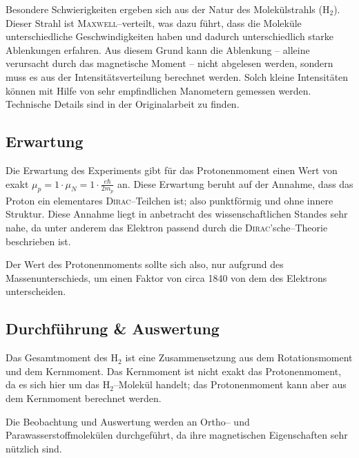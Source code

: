 \documentclass[sn-mathphys-num,iicol]{sn-jnl}
\theoremstyle{thmstyleone}
\theoremstyle{thmstyletwo}
\theoremstyle{thmstylethree}
\begin{document}
Besondere Schwierigkeiten ergeben sich aus der Natur des Molekülstrahls ($\text{H}_2$).
Dieser Strahl ist \textsc{Maxwell}--verteilt, was dazu führt, dass die Moleküle unterschiedliche Geschwindigkeiten haben und dadurch unterschiedlich starke Ablenkungen erfahren.
Aus diesem Grund kann die Ablenkung -- alleine verursacht durch das magnetische Moment -- nicht abgelesen werden, sondern muss es aus der Intensitätsverteilung berechnet werden.
Solch kleine Intensitäten können mit Hilfe von sehr empfindlichen Manometern gemessen werden.
Technische Details sind in der Originalarbeit\cite{FrischStern1933} zu finden.

\subsection{Erwartung}
Die Erwartung des Experiments gibt für das Protonenmoment einen Wert von exakt $\mu _p=1\cdot \mu _N=1\cdot \tfrac{e\hbar }{2m_p}$ an.
Diese Erwartung beruht auf der Annahme, dass das Proton ein elementares \textsc{Dirac}--Teilchen ist; also punktförmig und ohne innere Struktur.
Diese Annahme liegt in anbetracht des wissenschaftlichen Standes sehr nahe, da unter anderem das Elektron passend durch die \textsc{Dirac}'sche--Theorie beschrieben ist.

Der Wert des Protonenmoments sollte sich also, nur aufgrund des Massenunterschieds, um einen Faktor von circa 1840 von dem des Elektrons unterscheiden.\cite{FrischStern1933}

\subsection{Durchführung \& Auswertung}
Das Gesamtmoment des $\text{H}_2$ ist eine Zusammensetzung aus dem Rotationsmoment und dem Kernmoment.
Das Kernmoment ist nicht exakt das Protonenmoment, da es sich hier um das $\text{H}_2$--Molekül handelt; das Protonenmoment kann aber aus dem Kernmoment berechnet werden.

Die Beobachtung und Auswertung werden an Ortho-- und Parawasserstoffmolekülen durchgeführt, da ihre magnetischen Eigenschaften sehr nützlich sind.
\end{document}
